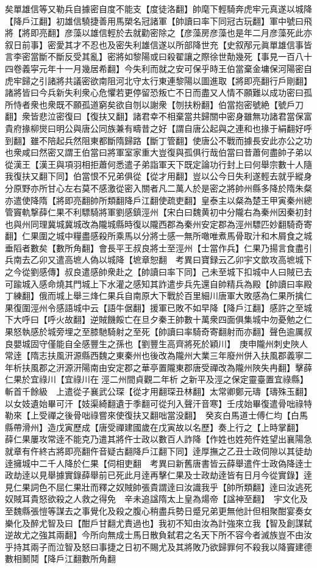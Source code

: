 矣單雄信等又勒兵自據密自度不能支【度徒洛翻】帥麾下輕騎奔虎牢元真遂以城降【降戶江翻】初雄信驍捷善用馬槊名冠諸軍【帥讀曰率下同冠古玩翻】軍中號曰飛將【將即亮翻】彦藻以雄信輕於去就勸密除之【彦藻房彦藻也是年二月彦藻死此亦叙日前事】密愛其才不忍也及密失利雄信遂以所部降世充【史叙邴元眞單雄信事皆言李密當斷不斷反受其亂】密將如黎陽或曰殺翟讓之際徐世勣幾死【事見一百八十四卷義寜元年十一月幾居希翻】今失利而就之安可保乎時王伯當棄金墉保河陽密自虎牢歸之引諸將共議密欲南阻河北守太行東連黎陽以圖進取【將即亮翻行戶剛翻】諸將皆曰今兵新失利衆心危懼若更停留恐叛亡不日而盡又人情不願難以成功密曰孤所恃者衆也衆既不願孤道窮矣欲自刎以謝衆【刎扶粉翻】伯當抱密號絶【號戶刀翻】衆皆悲泣密復曰【復扶又翻】諸君幸不相棄當共歸關中密身雖無功諸君當保富貴府掾柳爕曰明公與唐公同族兼有疇昔之好【謂自唐公起與之連和也掾于絹翻好呼到翻】雖不陪起兵然阻東都斷隋歸路【斷丁管翻】使唐公不戰而據長安此亦公之功也衆咸曰然密又謂王伯當曰將軍室家重大豈復與孤俱行哉伯當曰昔蕭何盡帥子弟以從漢王【漢王與項羽相拒蕭何悉遣子弟詣軍天下既定論功行封上曰何舉宗數十人隨我復扶又翻下同】伯當恨不兄弟俱從【從才用翻】豈以公今日失利遂輕去就乎縱身分原野亦所甘心左右莫不感激從密入關者凡二萬人於是密之將帥州縣多降於隋朱粲亦遣使降隋【將即亮翻帥所類翻降戶江翻使疏吏翻】皇泰主以粲為楚王甲寅秦州總管竇軌撃薛仁果不利驃騎將軍劉感鎮涇州【宋白曰魏黄初中分隴右為秦州因秦初封也與州同理冀城冀城改為隴城縣時復以隴西郡為秦州安定郡為涇州驃匹妙翻騎奇寄翻】仁果圍之城中糧盡感殺所乘馬以分將士感一無所噉唯煮馬骨取汁和木屑食之城垂䧟者數矣【數所角翻】會長平王叔良將士至涇州【士當作兵】仁果乃揚言食盡引兵南去乙卯又遣高墌人偽以城降【墌章恕翻　考異曰寶録云乙卯宇文歆攻高墌城下之今從劉感傳】叔良遣感帥衆赴之【帥讀曰率下同】己未至城下扣城中人曰賊已去可踰城入感命燒其門城上下水灌之感知其詐遣步兵先還自帥精兵為殿【帥讀曰率殿丁練翻】俄而城上舉三烽仁果兵自南原大下戰於百里細川唐軍大敗感為仁果所擒仁果復圍涇州令感語城中云【語牛倨翻】援軍已敗不如早降【降戶江翻】感許之至城下大呼曰【呼火故翻】逆賊饑餒亡在旦夕秦王帥數十萬衆四面俱集城中勿憂勉之仁果怒執感於城旁埋之至膝馳騎射之至死【帥讀曰率騎奇寄翻射而亦翻】聲色逾厲叔良嬰城固守僅能自全感豐生之孫也【劉豐生高齊將死於穎川】　庚申隴州刺史陜人常逹【隋志扶風汧源縣西魏之東秦州也後改為隴州大業三年廢州併入扶風郡義寧二年析扶風郡之汧源汧陽南由安定郡之華亭置隴東郡唐受禪改為隴州陜失冉翻】擊薛仁果於宜祿川【宜祿川在涇二州間貞觀二年析之新平及涇之保定靈臺置宜祿縣】斬首千餘級　上遣從子襄武公琛【從才用翻琛丑林翻】太常卿鄭元璹【璹殊玉翻】以女妓遺始畢可汗【妓渠綺翻遺于季翻可從刋入聲汗音寒】壬戌始畢復遣骨咄祿特勒來【上受禪之後骨咄祿嘗來使復扶又翻咄當没翻】　癸亥白馬道士傅仁均【白馬縣帶滑州】造戊寅歷成【唐受禪建國歲在戊寅故以名歷】奏上行之【上時掌翻】　薛仁果屢攻常逹不能克乃遣其將仵士政以數百人詐降【作姓也姓苑仵姓望出襄陽急就章有仵終古將即亮翻仵音疑古翻降戶江翻下同】逹厚撫之乙丑士政伺隙以其徒劫逹擁城中二千人降於仁果【伺相吏翻　考異曰新舊唐書皆云薛舉遣仵士政偽降逹士政劫逹以見舉據實錄薛舉前已死此月逹再擊仁果及士政劫逹皆有日月今從實錄】逹見仁果詞色不屈仁果壯而釋之奴賊帥張貴謂逹曰汝識我乎【帥所類翻】逹曰汝逃死奴賊耳貴怒欲殺之人救之得免　辛未追諡隋太上皇為煬帝【諡神至翻】　宇文化及至魏縣張愷等謀去之事覺化及殺之腹心稍盡兵勢日蹙兄弟更無他計但相聚酣宴奏女樂化及醉尤智及曰【酣戶甘翻尤責過也】我初不知由汝為計強來立我【智及創謀弑逆故尤之強其兩翻】今所向無成士馬日散負弑君之名天下所不容今者滅族豈不由汝乎持其兩子而泣智及怒曰事捷之日初不賜尤及其將敗乃欲歸罪何不殺我以降竇建德數相鬭鬩【降戶江翻數所角翻